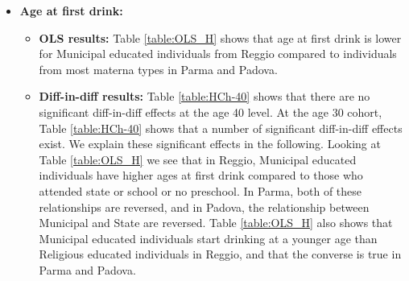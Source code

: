 \documentclass[11pt]{article}
\begin{document}
\begin{itemize}
\item \textbf{Age at first drink:} 
	
	\begin{itemize}
	\item \textbf{OLS results:} Table  \ref{table:OLS_H} shows that age at first drink is lower for Municipal educated individuals from Reggio compared to individuals from most materna types in Parma and Padova.
	
	\item \textbf{Diff-in-diff results:} Table \ref{table:HCh-40} shows that there are no significant diff-in-diff effects at the age 40 level. At the age 30 cohort, Table \ref{table:HCh-40} shows that a number of significant diff-in-diff effects exist. We explain these significant effects in the following. Looking at Table \ref{table:OLS_H} we see that in Reggio, Municipal educated individuals have higher ages at first drink compared to those who attended state or school or no preschool. In Parma, both of these relationships are reversed, and in Padova, the relationship between Municipal and State are reversed. Table \ref{table:OLS_H} also shows that Municipal educated individuals start drinking at a younger age than Religious educated individuals in Reggio, and that the converse is true in Parma and Padova.
	\end{itemize}
\end{itemize}
\end{document}
